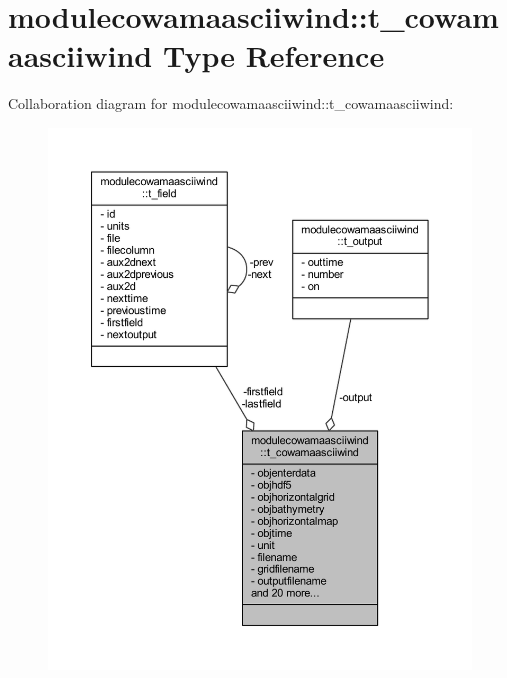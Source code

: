 \hypertarget{structmodulecowamaasciiwind_1_1t__cowamaasciiwind}{}\section{modulecowamaasciiwind\+:\+:t\+\_\+cowamaasciiwind Type Reference}
\label{structmodulecowamaasciiwind_1_1t__cowamaasciiwind}


Collaboration diagram for modulecowamaasciiwind\+:\+:t\+\_\+cowamaasciiwind\+:\nopagebreak
\begin{figure}[H]
\begin{center}
\leavevmode
\includegraphics[width=350pt]{structmodulecowamaasciiwind_1_1t__cowamaasciiwind__coll__graph}
\end{center}
\end{figure}
